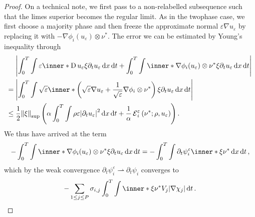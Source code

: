 \begin{proof}
	On a technical note, we first pass to a non-relabelled subsequence such 
	that the limes superior becomes the regular limit.
	As in the twophase case, we first choose a majority phase and then freeze 
	the approximate normal $ \varepsilon \nabla u_{ \varepsilon } $ by 
	replacing it with $ - \nabla \phi_{ i } ( u_{ \varepsilon } ) \otimes \nu^{ 
	\ast } $. The error we can be estimated by Young's inequality through
	\begin{align*}
		& \abs{
			\int_{ 0 }^{ T }
				\int
					\varepsilon
					\inner*{ \diff u_{ \varepsilon } \xi }{ \partial_{  t } u_{ 
					\varepsilon } }
				\dd{ x }
			\dd{ t }
			+
			\int_{ 0 }^{ T }
				\int
					\inner*{ \nabla \phi_{ i } ( u_{ \varepsilon } ) \otimes 
					\nu^{ \ast } \xi }{ \partial_{ t } u_{ \varepsilon } }
				\dd{ x }
			\dd{ t }
		}
		\\
		={} &
		\abs{
			\int_{ 0 }^{ T }
				\int
					\sqrt{ \varepsilon }
					\inner*{ 
						\left(
							\sqrt{ \varepsilon } \nabla u_{ \varepsilon }
							+
							\frac{ 1 }{ \sqrt{ \varepsilon } }
							\nabla \phi_{ i } \otimes \nu^{ \ast } 
						\right)
						\xi 
					}
					{ \partial_{ t } u_{ \varepsilon } }
				\dd{ x }
			\dd{ t }
		}
		\\
		\leq{} &
		\frac{ 1 }{ 2 }
		\norm{ \xi }_{ \mathrm{sup} }
		\left(
			\alpha 
			\int_{ 0 }^{ T }
				\int
					\rho \varepsilon 
					\abs{ \partial_{ t } u_{ \varepsilon } }^{ 2 }
				\dd{ x }
			\dd{ t }
			+
			\frac{ 1 }{ \alpha }
			\tilt_excess_{ i }^{ \varepsilon } \left( \nu^{ \ast } ; \rho , 
			u_{ 
			\varepsilon }  \right)
		\right).
	\end{align*}
	We thus have arrived at the term
	\begin{equation*}
		- \int_{ 0 }^{ T }
			\int
				\inner*{ \nabla \phi_{ i } ( u_{ \varepsilon } ) \otimes \nu^{ 
				\ast } \xi }{ \partial_{ t } u_{ \varepsilon } }
			\dd{ x }
		\dd{ t }
		= 
		- \int_{ 0 }^{ T }
			\int
				\partial_{ t } \psi_{ i }^{ \varepsilon }
				\inner*{ \xi }{ \nu^{ \ast } }
			\dd{ x }
		\dd{ t },
	\end{equation*} 
	which by the weak convergence $ \partial_{ t } \psi_{ i }^{ \varepsilon } 
	\rightharpoonup \partial_{ t } \psi_{ i } $ converges to
	\begin{equation*}
		- \sum_{ 1 \leq j \leq P }
			\sigma_{ i , j }
			\int_{ 0 }^{ T }
				\int
					\inner*{ \xi }{ \nu^{ \ast } }
					V_{ j }
				\abs{ \nabla \chi_{ j } }
			\dd{ t }.
	\end{equation*}

\end{proof}
